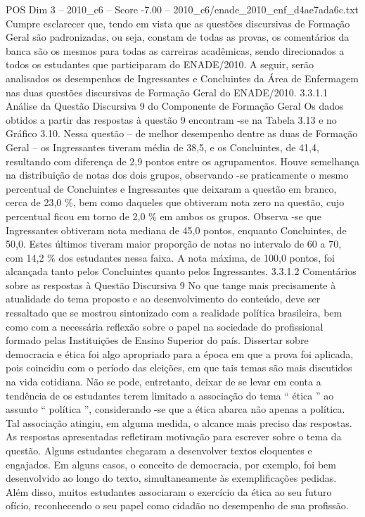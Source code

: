 \begin{textsample}{POS Dim 3 – 2010\_c6 – Score -7.00 – 2010\_c6/enade\_2010\_enf\_d4ae7ada6c.txt}
Cumpre esclarecer que, tendo em vista que as questões discursivas de Formação Geral são padronizadas, ou seja, constam de todas as provas, os comentários da banca são os mesmos para todas as carreiras acadêmicas, sendo direcionados a todos os estudantes que participaram do ENADE/2010.
A seguir, serão analisados os desempenhos de Ingressantes e Concluintes da Área de Enfermagem nas duas questões discursivas de Formação Geral do ENADE/2010. 3.3.1.1 Análise da Questão Discursiva 9 do Componente de Formação Geral Os dados obtidos a partir das respostas à questão 9 encontram -se na Tabela 3.13 e no Gráfico 3.10.
Nessa questão – de melhor desempenho dentre as duas de Formação Geral – os Ingressantes tiveram média de 38,5, e os Concluintes, de 41,4, resultando com diferença de 2,9 pontos entre os agrupamentos.
Houve semelhança na distribuição de notas dos dois grupos, observando -se praticamente o mesmo percentual de Concluintes e Ingressantes que deixaram a questão em branco, cerca de 23,0 \%, bem como daqueles que obtiveram nota zero na questão, cujo percentual ficou em torno de 2,0 \% em ambos os grupos.
Observa -se que Ingressantes obtiveram nota mediana de 45,0 pontos, enquanto Concluintes, de 50,0.
Estes últimos tiveram maior proporção de notas no intervalo de 60 a 70, com 14,2 \% dos estudantes nessa faixa.
A nota máxima, de 100,0 pontos, foi alcançada tanto pelos Concluintes quanto pelos Ingressantes. 3.3.1.2 Comentários sobre as respostas à Questão Discursiva 9 No que tange mais precisamente à atualidade do tema proposto e ao desenvolvimento do conteúdo, deve ser ressaltado que se mostrou sintonizado com a realidade política brasileira, bem como com a necessária reflexão sobre o papel na sociedade do profissional formado pelas Instituições de Ensino Superior do país.
Dissertar sobre democracia e ética foi algo apropriado para a época em que a prova foi aplicada, pois coincidiu com o período das eleições, em que tais temas são mais discutidos na vida cotidiana.
Não se pode, entretanto, deixar de se levar em conta a tendência de os estudantes terem limitado a associação do tema “ ética ” ao assunto “ política ”, considerando -se que a ética abarca não apenas a política.
Tal associação atingiu, em alguma medida, o alcance mais preciso das respostas.
As respostas apresentadas refletiram motivação para escrever sobre o tema da questão.
Alguns estudantes chegaram a desenvolver textos eloquentes e engajados.
Em alguns casos, o conceito de democracia, por exemplo, foi bem desenvolvido ao longo do texto, simultaneamente às exemplificações pedidas.
Além disso, muitos estudantes associaram o exercício da ética ao seu futuro ofício, reconhecendo o seu papel como cidadão no desempenho de sua profissão.

\end{textsample}
